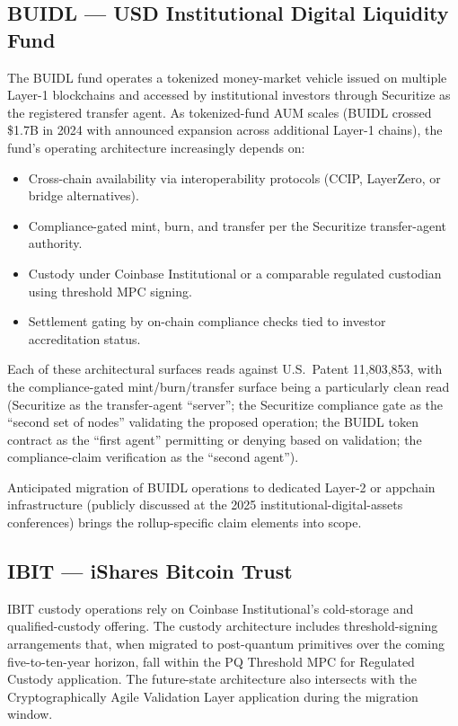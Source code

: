 \documentclass[11pt,letterpaper]{article}
\begin{document}
\subsection{BUIDL --- USD Institutional Digital Liquidity Fund}

The BUIDL fund operates a tokenized money-market vehicle issued on multiple Layer-1 blockchains and accessed by institutional investors through Securitize as the registered transfer agent. As tokenized-fund AUM scales (BUIDL crossed \$1.7B in 2024 with announced expansion across additional Layer-1 chains), the fund's operating architecture increasingly depends on:

\begin{itemize}
\item Cross-chain availability via interoperability protocols (CCIP, LayerZero, or bridge alternatives).
\item Compliance-gated mint, burn, and transfer per the Securitize transfer-agent authority.
\item Custody under Coinbase Institutional or a comparable regulated custodian using threshold MPC signing.
\item Settlement gating by on-chain compliance checks tied to investor accreditation status.
\end{itemize}

Each of these architectural surfaces reads against U.S.\ Patent 11,803,853, with the compliance-gated mint/burn/transfer surface being a particularly clean read (Securitize as the transfer-agent ``server''; the Securitize compliance gate as the ``second set of nodes'' validating the proposed operation; the BUIDL token contract as the ``first agent'' permitting or denying based on validation; the compliance-claim verification as the ``second agent'').

Anticipated migration of BUIDL operations to dedicated Layer-2 or appchain infrastructure (publicly discussed at the 2025 institutional-digital-assets conferences) brings the rollup-specific claim elements into scope.

\subsection{IBIT --- iShares Bitcoin Trust}

IBIT custody operations rely on Coinbase Institutional's cold-storage and qualified-custody offering. The custody architecture includes threshold-signing arrangements that, when migrated to post-quantum primitives over the coming five-to-ten-year horizon, fall within the PQ Threshold MPC for Regulated Custody application. The future-state architecture also intersects with the Cryptographically Agile Validation Layer application during the migration window.
\end{document}
